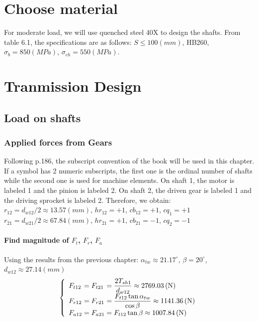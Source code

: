\section{Choose material}
For moderate load, we will use quenched steel 40X to design the shafts. From table 6.1, the specifications are as follows: $ S \leq 100\unit{(mm)} $, HB260, $ \sigma_b = 850\unit{(MPa)}$, $ \sigma_{ch} = 550\unit{(MPa)}$. 

\section{Tranmission Design}
\subsection{Load on shafts}
\subsubsection{Applied forces from Gears}
Following p.186, the subscript convention of the book will be used in this chapter. If a symbol has 2 numeric subscripts, the first one is the ordinal number of shafts while the second one is used for machine elements. On shaft 1, the motor is labeled 1 and the pinion is labeled 2. On shaft 2, the driven gear is labeled 1 and the driving sprocket is labeled 2. Therefore, we obtain:\\
$ r_{12} = d_{w12}/2 \approx 13.57\unit{(mm)}$, $ hr_{12} = +1 $, $ cb_{12} = +1 $, $ cq_1 = +1 $\\
$ r_{21} = d_{w21}/2 \approx 67.84\unit{(mm)}$, $ hr_{21} = +1 $, $ cb_{21} = -1$, $ cq_2 = -1$
\paragraph{Find magnitude of $ F_{t} $, $ F_r $, $ F_a $}
Using the results from the previous chapter: $ \alpha_{tw} \approx 21.17^\circ $, $ \beta = 20^\circ $, $ d_{w12}\approx 27.14\unit{(mm)} $
\[
\left\{ 
\begin{array}{l@{{}={}}l@{{}={}}l}
F_{t12}& F_{t21}& \dfrac{2T_{sh1}}{d_{w12}}\approx 2769.03\unit{(N)}\\
F_{r12}& F_{r21}&  \dfrac{F_{t12}\tan\alpha_{tw}}{\cos\beta}\approx1141.36\unit{(N)}\\
F_{a12}& F_{a21}& F_{t12}\tan\beta\approx1007.84\unit{(N)}\\ 
\end{array}
\right.
\]
